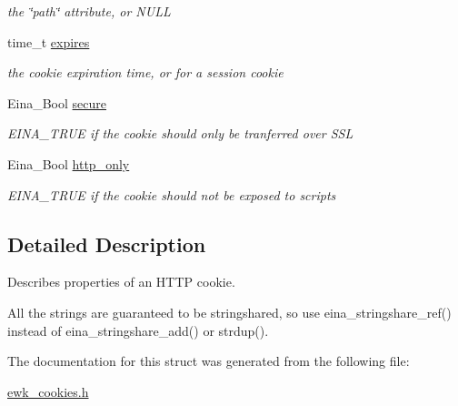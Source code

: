 \begin{DoxyCompactItemize}
\begin{DoxyCompactList}\small\item\em the \char`\"{}path\char`\"{} attribute, or {\ttfamily N\+U\+L\+L} \end{DoxyCompactList}\item 
\hypertarget{struct__Ewk__Cookie_a1805499161a9d618ef2e2aad53096855}{time\+\_\+t \hyperlink{struct__Ewk__Cookie_a1805499161a9d618ef2e2aad53096855}{expires}}\label{struct__Ewk__Cookie_a1805499161a9d618ef2e2aad53096855}

\begin{DoxyCompactList}\small\item\em the cookie expiration time, or {} for a session cookie \end{DoxyCompactList}\item 
\hypertarget{struct__Ewk__Cookie_a34c163de94b60707fdb8ef942ab51c25}{Eina\+\_\+\+Bool \hyperlink{struct__Ewk__Cookie_a34c163de94b60707fdb8ef942ab51c25}{secure}}\label{struct__Ewk__Cookie_a34c163de94b60707fdb8ef942ab51c25}

\begin{DoxyCompactList}\small\item\em {\ttfamily E\+I\+N\+A\+\_\+\+T\+R\+U\+E} if the cookie should only be tranferred over S\+S\+L \end{DoxyCompactList}\item 
\hypertarget{struct__Ewk__Cookie_a3c81ed784e1a411a2da5038aea4c2c4a}{Eina\+\_\+\+Bool \hyperlink{struct__Ewk__Cookie_a3c81ed784e1a411a2da5038aea4c2c4a}{http\+\_\+only}}\label{struct__Ewk__Cookie_a3c81ed784e1a411a2da5038aea4c2c4a}

\begin{DoxyCompactList}\small\item\em {\ttfamily E\+I\+N\+A\+\_\+\+T\+R\+U\+E} if the cookie should not be exposed to scripts \end{DoxyCompactList}\end{DoxyCompactItemize}


\subsection{Detailed Description}
Describes properties of an H\+T\+T\+P cookie. 

All the strings are guaranteed to be stringshared, so use eina\+\_\+stringshare\+\_\+ref() instead of eina\+\_\+stringshare\+\_\+add() or strdup(). 

The documentation for this struct was generated from the following file\+:\begin{DoxyCompactItemize}
\item 
\hyperlink{ewk__cookies_8h}{ewk\+\_\+cookies.\+h}\end{DoxyCompactItemize}
